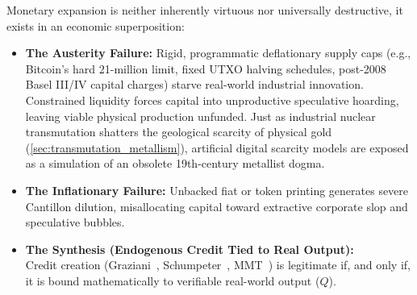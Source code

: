 \documentclass[a4paper,11pt,twoside,parskip=half-,headings=small]{scrartcl}
\begin{document}
Monetary expansion is neither inherently virtuous nor universally destructive, it exists
in an economic superposition:
\begin{itemize}
  \item \textbf{The Austerity Failure:} Rigid, programmatic deflationary supply caps
(e.g., Bitcoin's hard 21-million limit, fixed UTXO halving schedules, post-2008 Basel III/IV capital charges)
starve real-world industrial innovation. Constrained liquidity forces capital into
unproductive speculative hoarding, leaving viable physical production unfunded. Just as industrial nuclear transmutation shatters the geological scarcity of physical gold (\cref{sec:transmutation_metallism}), artificial digital scarcity models are exposed as a simulation of an obsolete 19th-century metallist dogma.
  \item \textbf{The Inflationary Failure:} Unbacked fiat or token printing generates
severe Cantillon dilution, misallocating capital toward extractive corporate
slop and speculative bubbles.
  \item \textbf{The Synthesis (Endogenous Credit Tied to Real Output):}\\
Credit creation (Graziani~\cite{graziani2003}, Schumpeter~\cite{schumpeter1934}, MMT~\cite{wray2015modern})
is legitimate if, and only if, it is bound mathematically to verifiable real-world
output ($Q$).
\end{itemize}
\end{document}
